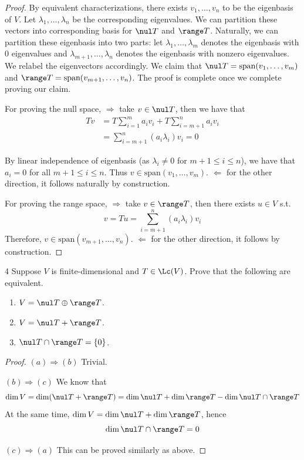 \documentclass{extarticle}
\begin{document}
\begin{proof}
By equivalent characterizations, there exists \(v_1, \ldots, v_n\) to be the eigenbasis of \(V\). Let 
\(\lambda_1, \ldots, \lambda_n\) be the corresponding eigenvalues. We can partition these vectors into corresponding 
basis for \(\nul T\) and \(\range T\). Naturally, we can partition these eigenbasis into two parts: let 
\(\lambda_1, \ldots, \lambda_m\) denotes the eigenbasis with 0 eigenvalues and \(\lambda_{m+1}, \ldots, 
\lambda_n\) denotes the eigenbasis with nonzero eigenvalues. We relabel the eigenvectors accordingly. 
We claim that \(\nul T = \text{span}(v_1, 
\ldots, v_m)\) and \(\range T = \text{span}(v_{m+1}, \ldots, v_n)\). The proof is complete once 
we complete proving our claim. 

For proving the null space, \(\Rightarrow\) take \(v \in \nul T\), then we have that 
\begin{align*}
    Tv 
    &= T \sum_{i=1}^{m}a_i v_i + T \sum_{i=m+1}^{n} a_i v_i \\ 
    &= \sum_{i=m+1}^{n} (a_i \lambda_i) v_i = 0 
\end{align*}

By linear independence of eigenbasis (as \(\lambda_i \neq 0 \) for \(m+1 \leq i \leq n\)), we have that 
\(a_i = 0\) for all \(m+1 \leq i \leq n\). Thus \(v \in \text{span}(v_1, \ldots, v_m)\). \(\Leftarrow\) 
for the other direction, it follows naturally by construction. 

For proving the range space, \(\Rightarrow\) take \(v \in \range T\), then there exists \(u \in V\) 
s.t. 
\[v = Tu  = \sum_{i=m+1}^{n} (a_i \lambda_i)v_i\]
Therefore, \(v \in \text{span}(v_{m+1}, \ldots, v_n)\). \(\Leftarrow\) for the other direction, it follows 
by construction. 
\end{proof}

\begin{problem}{4}
    Suppose \(V\) is finite-dimensional and \(T \in \Lc(V)\). Prove that the following are equivalent.
    \begin{enumerate}[label=(\alph*)]
        \item \(V = \nul T \oplus \range T\). 
        \item \(V = \nul T + \range T\). 
        \item \(\nul T \cap \range T = \{0\}\).
    \end{enumerate}
\end{problem}

\begin{proof}
\((a) \Rightarrow (b)\) Trivial. 

\((b) \Rightarrow (c)\) We know that 
\[\dim V = \dim (\nul T  + \range T) = \dim \nul T + \dim \range T - \dim \nul T \cap \range T\]
At the same time, \(\dim V = \dim \nul T + \dim \range T\), hence 
\[\dim \nul T \cap \range T = 0\]

\((c) \Rightarrow (a)\) This can be proved similarly as above. 
\end{proof}
\end{document}
